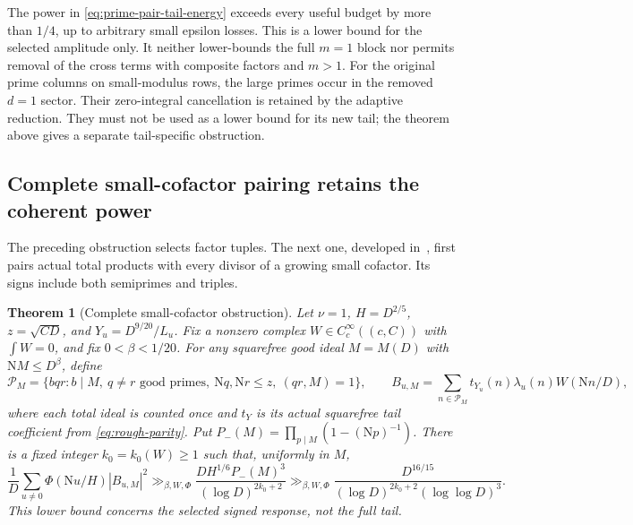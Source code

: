 \documentclass[11pt]{article}
\numberwithin{equation}{section}
\newtheorem{theorem}{Theorem}[section]
\theoremstyle{definition}
\theoremstyle{remark}
\newcommand{\N}{\mathrm N}
\begin{document}
The power in \eqref{eq:prime-pair-tail-energy} exceeds every useful
budget by more than \(1/4\), up to arbitrary small epsilon losses.
This is a lower bound for the selected amplitude only.
It neither lower-bounds the full \(m=1\) block nor permits removal
of the cross terms with composite factors and \(m>1\).
For the original prime columns on small-modulus rows, the large
primes occur in the removed \(d=1\) sector. Their zero-integral
cancellation is retained by the adaptive reduction. They must not
be used as a lower bound for its new tail; the theorem above gives
a separate tail-specific obstruction.

\subsection{Complete small-cofactor pairing retains the coherent power}

The preceding obstruction selects factor tuples. The next one, developed
in~\cite{N24}, first pairs actual total products with every divisor of
a growing small cofactor. Its signs include both semiprimes and triples.

\begin{theorem}[Complete small-cofactor obstruction]
\label{thm:complete-cofactor-obstruction}
Let \(\nu=1\), \(H=D^{2/5}\), \(z=\sqrt{CD}\), and
\(Y_u=D^{9/20}/L_u\). Fix a nonzero complex
\(W\in C_c^\infty((c,C))\) with \(\int W=0\), and fix
\(0<\beta<1/20\). For any squarefree good ideal \(M=M(D)\)
with \(\N M\le D^\beta\), define
\[
 \mathcal P_M=\{bqr:b\mid M,\ q\ne r\text{ good primes},\
                 \N q,\N r\le z,\ (qr,M)=1\},
 \qquad
 B_{u,M}=\sum_{n\in\mathcal P_M}
                  t_{Y_u}(n)\lambda_u(n)W(\N n/D),
\]
where each total ideal is counted once and \(t_Y\) is its actual
squarefree tail coefficient from \eqref{eq:rough-parity}.
Put \(P_-(M)=\prod_{p\mid M}(1-(\N p)^{-1})\). There is a
fixed integer \(k_0=k_0(W)\ge1\) such that, uniformly in \(M\),
\begin{equation}\label{eq:complete-cofactor-energy}
 \frac1D\sum_{u\ne0}\Phi(\N u/H)|B_{u,M}|^2
 \gg_{\beta,W,\Phi}
 \frac{D H^{1/6}P_-(M)^3}{(\log D)^{2k_0+2}}
 \gg_{\beta,W,\Phi}
 \frac{D^{16/15}}
      {(\log D)^{2k_0+2}(\log\log D)^3}.
\end{equation}
This lower bound concerns the selected signed response, not the full tail.
\end{theorem}
\end{document}
